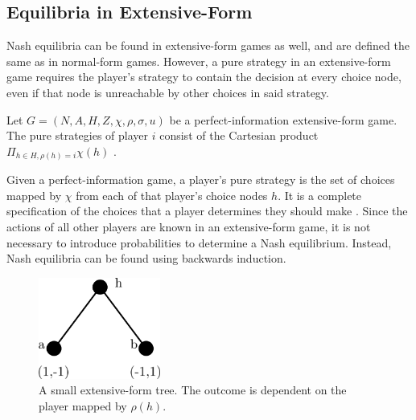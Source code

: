 \subsection{Equilibria in Extensive-Form}
Nash equilibria can be found in extensive-form games as well, and are defined the same as in normal-form games. However, a pure strategy in an extensive-form game requires the player's strategy to contain the decision at every choice node, even if that node is unreachable by other choices in said strategy.\\
\begin{define}
  Let $G = (N, A, H, Z, \chi, \rho, \sigma, u)$ be a perfect-information extensive-form game. The pure strategies of player $i$ consist of the Cartesian product $\Pi_{h\in H, \rho(h)=i}\chi(h)$ \cite{shoh09}.
\end{define}
Given a perfect-information game, a player's pure strategy is the set of choices mapped by $\chi$ from each of that player's choice nodes $h$. It is a complete specification of the choices that a player determines they should make \cite{shoh09}. Since the actions of all other players are known in an extensive-form game, it is not necessary to introduce probabilities to determine a Nash equilibrium. Instead, Nash equilibria can be found using backwards induction.

\begin{figure}[H]
  \centering
  \includegraphics[width=4cm]{figures/ExampleBackwardInduction.png}
  \caption{A small extensive-form tree. The outcome is dependent on the player mapped by $\rho(h)$.}
  \label{fig:BackwardInduction}
\end{figure}

